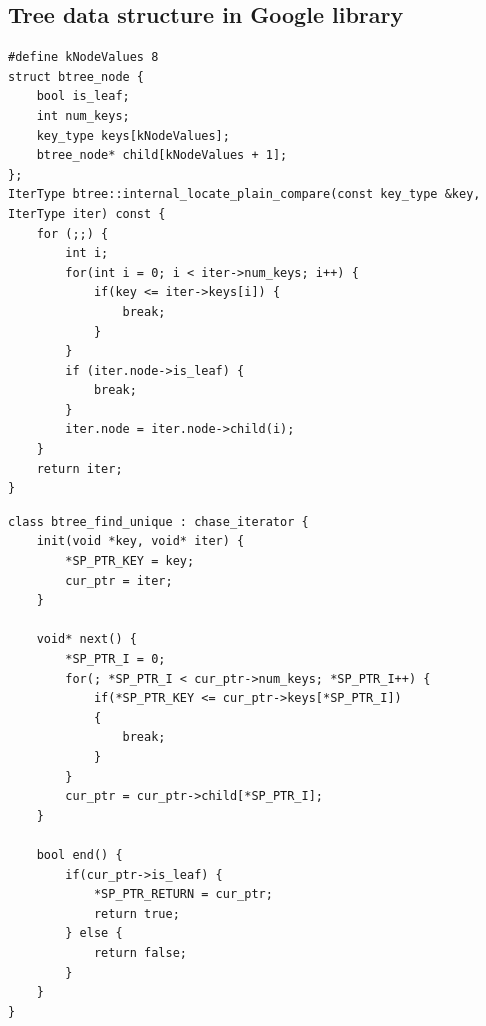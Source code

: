 \begin{minipage}{0.47\textwidth}
\subsection{Tree data structure in Google library}
\centering
\begin{lstlisting}[caption={Google realization for\\\code{btree::internal\_locate\_plain\_compare()}},label={lst:btree}, captionpos=t]
#define kNodeValues 8
struct btree_node {
    bool is_leaf;    
    int num_keys;
    key_type keys[kNodeValues];
    btree_node* child[kNodeValues + 1];
};
IterType btree::internal_locate_plain_compare(const key_type &key, IterType iter) const {
    for (;;) { 
        int i;
        for(int i = 0; i < iter->num_keys; i++) {
            if(key <= iter->keys[i]) {
                break;
            }
        }
        if (iter.node->is_leaf) {
            break;
        }
        iter.node = iter.node->child(i);
    }
    return iter;
}
\end{lstlisting}

\begin{lstlisting}[caption={\pulse realization for\\\code{btree::internal\_locate\_plain\_compare()}},label={lst:btree_mod}, captionpos=t]
class btree_find_unique : chase_iterator {
    init(void *key, void* iter) {
        *SP_PTR_KEY = key;
        cur_ptr = iter;
    }
  
    void* next() {
        *SP_PTR_I = 0;
        for(; *SP_PTR_I < cur_ptr->num_keys; *SP_PTR_I++) {
            if(*SP_PTR_KEY <= cur_ptr->keys[*SP_PTR_I]) 
            {
                break;
            }
        }
        cur_ptr = cur_ptr->child[*SP_PTR_I];
    }
  
    bool end() {
        if(cur_ptr->is_leaf) {
            *SP_PTR_RETURN = cur_ptr;
            return true;
        } else {
            return false;
        }
    }
}
\end{lstlisting}
\end{minipage}







